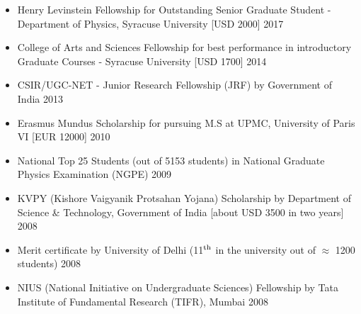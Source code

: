 
 \begin{itemize}
 \vspace{1mm} 
 \item Henry Levinstein Fellowship for Outstanding Senior Graduate Student - Department of Physics, Syracuse University [USD 2000] \hfill 2017  \vspace{1mm} 
\item  College of Arts and Sciences Fellowship for best performance in introductory Graduate Courses - Syracuse University [USD 1700] \hfill 2014  \vspace{1mm} 
 \item CSIR/UGC-NET - Junior Research Fellowship (JRF) by Government of India \hfill 2013 \vspace{1mm} 
 \item Erasmus Mundus Scholarship for pursuing M.S at UPMC, University of Paris VI  [EUR 12000] \hfill \textsc{2010} \vspace{1mm} 
 \item National Top 25 Students (out of 5153 students) in National Graduate Physics Examination (NGPE) \hfill \textsc{2009} \vspace{1mm} 
  \item KVPY (Kishore Vaigyanik Protsahan Yojana) Scholarship by Department of Science \& Technology, Government of India [about USD 3500 in two years] \hfill 2008 
 \item Merit certificate by University of Delhi (11$^{\rm{th}}$ in the university out of $\approx$ 1200 students) \hfill 2008 \vspace{1mm} 
 \item NIUS (National Initiative on Undergraduate Sciences) Fellowship by Tata Institute of Fundamental Research (TIFR), Mumbai  \hfill 2008 \vspace{1mm} 
 \end{itemize} 
